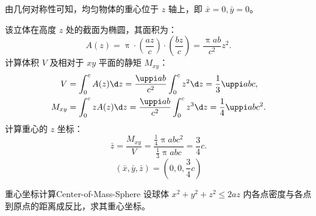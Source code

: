 \begin{solution}
    由几何对称性可知，均匀物体的重心位于 $z$ 轴上，即 $\bar{x} = 0, \bar{y} = 0$。

    该立体在高度 $z$ 处的截面为椭圆，其面积为：
    \begin{equation}\label{eq:area-z}
        A(z) = \uppi \cdot \left( \frac{a z}{c} \right) \cdot \left( \frac{b z}{c} \right) = \frac{\uppi ab}{c^2} z^2.
    \end{equation}
    计算体积 $V$ 及相对于 $xy$ 平面的静矩 $M_{xy}$：
    \begin{equation}\label{eq:v-and-m}
        \begin{aligned}
            V      & = \int_0^c A(z) \d z = \frac{\uppi ab}{c^2} \int_0^c z^2 \d z = \frac{1}{3} \uppi abc,     \\
            M_{xy} & = \int_0^c z A(z) \d z = \frac{\uppi ab}{c^2} \int_0^c z^3 \d z = \frac{1}{4} \uppi abc^2.
        \end{aligned}
    \end{equation}
    计算重心的 $z$ 坐标：
    \begin{equation}\label{eq:z-bar}
        \bar{z} = \frac{M_{xy}}{V} = \frac{\frac{1}{4} \uppi abc^2}{\frac{1}{3} \uppi abc} = \frac{3}{4} c.
    \end{equation}
    \begin{equation}
        \boxed{(\bar{x}, \bar{y}, \bar{z}) = \left( 0, 0, \frac{3}{4} c \right)}
    \end{equation}
\end{solution}

\begin{problem}{重心坐标计算}{Center-of-Mass-Sphere}
    设球体 $x^2 + y^2 + z^2 \leqslant 2az$ 内各点密度与各点到原点的距离成反比，求其重心坐标。
\end{problem}

